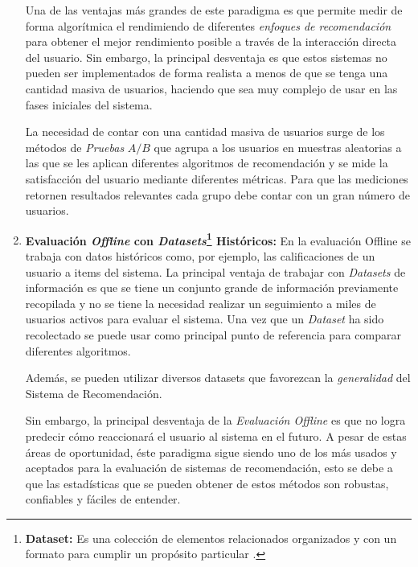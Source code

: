 \begin{enumerate}
    Una de las ventajas más grandes de este paradigma es que permite medir de forma algorítmica el rendimiendo de diferentes \textit{enfoques de recomendación} para obtener el mejor rendimiento posible a través de la interacción directa del usuario. Sin embargo, la principal desventaja es que estos sistemas no pueden ser implementados de forma realista a menos de que se tenga una cantidad masiva de usuarios, haciendo que sea muy complejo de usar en las fases iniciales del sistema.

    La necesidad de contar con una cantidad masiva de usuarios surge de los métodos de \textit{Pruebas} $A / B$ que agrupa a los usuarios en muestras aleatorias a las que se les aplican diferentes algoritmos de recomendación y se mide la satisfacción del usuario mediante diferentes métricas. Para que las mediciones retornen resultados relevantes cada grupo debe contar con un gran número de usuarios.

    \newpage
    \thispagestyle{plain}
    \vspace*{0.2cm}

    \item \textbf{Evaluación \textit{Offline} con \textit{Datasets}\footnote{\textbf{Dataset: } Es una colección de elementos relacionados organizados y con un formato para cumplir un propósito particular \parencite{chapman-2019}.} Históricos: } En la evaluación Offline se trabaja con datos históricos como, por ejemplo, las calificaciones de un usuario a items del sistema. La principal ventaja de trabajar con \textit{Datasets} de información es que se tiene un conjunto grande de información previamente recopilada y no se tiene la necesidad realizar un seguimiento a miles de usuarios activos para evaluar el sistema. Una vez que un \textit{Dataset} ha sido recolectado se puede usar como principal punto de referencia para comparar diferentes algoritmos.
    
    Además, se pueden utilizar diversos datasets que favorezcan la \textit{generalidad} del Sistema de Recomendación.

    Sin embargo, la principal desventaja de la \textit{Evaluación Offline} es que no logra predecir cómo reaccionará el usuario al sistema en el futuro.
    A pesar de estas áreas de oportunidad, éste paradigma sigue siendo uno de los más usados y aceptados para la evaluación de sistemas de recomendación, esto se debe a que las estadísticas que se pueden obtener de estos métodos son robustas, confiables y fáciles de entender.

\end{enumerate}

